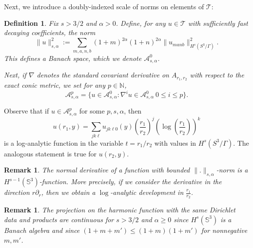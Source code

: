 \documentclass[12pt]{article}
\newtheorem{defn}[thm]{Definition}
\newtheorem{rem}[thm]{Remark}
\newcommand{\NN}{\mathbb N}
\newcommand{\calA}{{\mathcal A}}
\newcommand{\calT}{{\mathcal T}}
\begin{document}
Next, we introduce a doubly-indexed scale of norms on elements of $\calT$: 
\begin{defn}
Fix $s > 3/2$ and $\alpha > 0$.  Define, for any $u \in \calT$ with sufficiently fast decaying coefficients, the norm
\[
\|u\|_{s,\alpha}^2:= \sum_{m,a,n,b} (1+m)^{2\alpha}(1+n)^{2\alpha} \|u_{manb}\|_{H^s(S^3/\Gamma)}^2. 
\]
This defines a Banach space, which we denote $\calA_{s,\alpha}^0$. 

Next, if $\nabla$ denotes the standard covariant derivative on $A_{r_1, r_2}$ with respect to the exact
conic metric, we set for any $p \in \NN$, 
\[
\calA^p_{s,\alpha} = \{ u \in \calA^0_{s,\alpha}:  \nabla^i u \in \calA^0_{s,\alpha}\ 0 \leq i \leq p\}.
\]
    
\end{defn}

Observe that if $u \in \calA^p_{s,\alpha}$ for some $p, s, \alpha$, then 
\[
u(r_1,y)=\sum_{j k \ell} u_{j k \ell 0}(y) \left(\frac{r_1}{r_2} \right)^j \left( \log \left(\frac{r_1}{r_2} \right) \right)^k
\]
is a log-analytic function in the variable $t = r_1/r_2$ with values in  $H^s(S^3/\Gamma)$.  The analogous
statement is true for $u(r_2, y)$. 

\begin{rem}
   The normal derivative of a function with bounded $\|.\|_{s,\alpha}$-norm is a $H^{s-1}(\mathbb{S}^3)$-function. More precisely, if we consider the derivative in the direction $r\partial_r$, then we obtain a $\log$-analytic development in $\frac{r_1}{r_2}$.
\end{rem}

\begin{rem}
    The projection on the harmonic function with the same Dirichlet data and products are continuous for $s>3/2$ and $\alpha\geqslant 0$ since $H^s(\mathbb{S}^3)$ is a Banach algebra and since $(1+m+m')\leqslant(1+m)(1+m')$ for nonnegative $m,m'$.
\end{rem}
\end{document}
